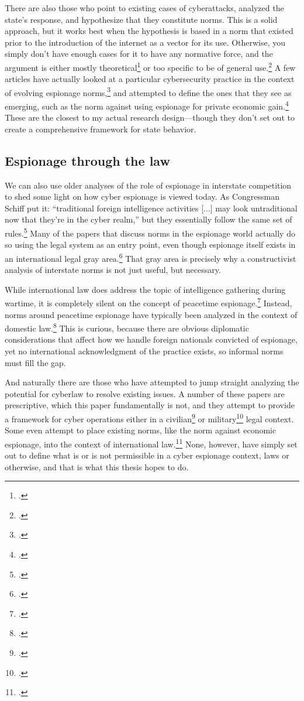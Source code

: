 \documentclass{memoir}
\begin{document}
\begin{refsegment}
There are also those who point to existing cases of cyberattacks, analyzed the state's response, and hypothesize that they constitute norms. This is a solid approach, but it works best when the hypothesis is based in a norm that existed prior to the introduction of the internet as a vector for its use. Otherwise, you simply don't have enough cases for it to have any normative force, and the argument is either mostly theoretical\footcite{neutze_cyber_2013} or too specific to be of general use.\footcite{caso_rules_2014} A few articles have actually looked at a particular cybersecurity practice in the context of evolving espionage norms,\footcite{libicki_coming_2017} and attempted to define the ones that they see as emerging, such as the norm against using espionage for private economic gain.\footcite{rascoff_norm_2016} These are the closest to my actual research design---though they don't set out to create a comprehensive framework for state behavior.

\subsection{Espionage through the law}
We can also use older analyses of the role of espionage in interstate competition to shed some light on how cyber espionage is viewed today. As Congressman Schiff put it: ``traditional foreign intelligence activities [...] may look untraditional now that they’re in the cyber realm,'' but they essentially follow the same set of rules.\footcite{nakashima_hacks_2015} Many of the papers that discuss norms in the espionage world actually do so using the legal system as an entry point, even though espionage itself exists in an international legal gray area.\footcite{beim_enforcing_2018} That gray area is precisely why a constructivist analysis of interstate norms is not just useful, but necessary.

While international law does address the topic of intelligence gathering during wartime, it is completely silent on the concept of peacetime espionage.\footcite{radsan_unresolved_2007} Instead, norms around peacetime espionage have typically been analyzed in the context of domestic law.\footcite{demarest_espionage_1995} This is curious, because there are obvious diplomatic considerations that affect how we handle foreign nationals convicted of espionage, yet no international acknowledgment of the practice exists, so informal norms must fill the gap.

And naturally there are those who have attempted to jump straight analyzing the potential for cyberlaw to resolve existing issues. A number of these papers are prescriptive, which this paper fundamentally is not, and they attempt to provide a framework for cyber operations either in a civilian\footcite{yurcik_internet_2001} or military\footcite{kehler_rules_2017} legal context. Some even attempt to place existing norms, like the norm against economic espionage, into the context of international law.\footcite{lotrionte_countering_2015} None, however, have simply set out to define what is or is not permissible in a cyber espionage context, laws or otherwise, and that is what this thesis hopes to do.



\end{refsegment}
\end{document}
